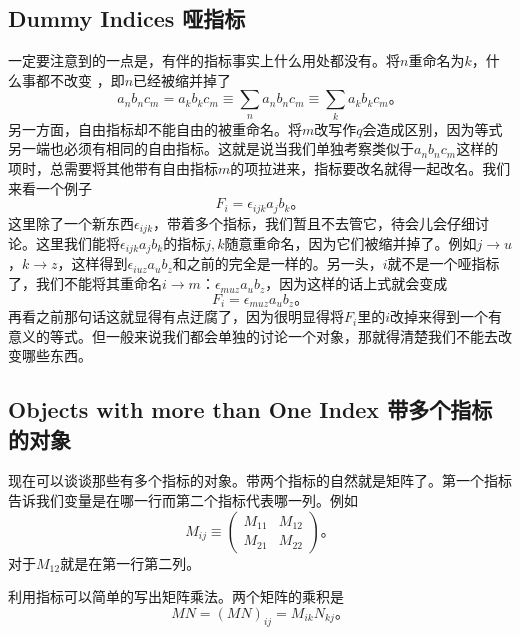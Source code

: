 \subsection[哑指标]{Dummy Indices 哑指标}\label{appendix.B.5.1}
一定要注意到的一点是，有伴的指标事实上什么用处都没有。将$n$重命名为$k$，什么事都不改变%
%
，即$n$已经被缩并掉了
\begin{equation}
a_n b_n c_m = a_k b_k c_m \equiv \sum\limits_n a_nb_nc_m \equiv \sum\limits_k a_kb_kc_m \text{。}
\end{equation}
另一方面，自由指标却不能自由的被重命名。将$m$改写作$q$会造成区别，因为等式另一端也必须有相同的自由指标。这就是说当我们单独考察类似于$a_nb_nc_m$这样的项时，总需要将其他带有自由指标$m$的项拉进来，指标要改名就得一起改名。我们来看一个例子
\begin{equation}
F_i = \epsilon_{ijk}a_jb_k\text{。}
\end{equation}
这里除了一个新东西$\epsilon_{ijk}$，带着多个指标，我们暂且不去管它，待会儿会仔细讨论。这里我们能将$\epsilon_{ijk}a_jb_k$的指标$j,k$随意重命名，因为它们被缩并掉了。例如$j\rightarrow u$，$k\rightarrow z$，这样得到$\epsilon_{iuz}a_ub_z$和之前的完全是一样的。另一头，$i$就不是一个哑指标了，我们不能将其重命名$i\rightarrow m$：$\epsilon_{muz}a_ub_z$，因为这样的话上式就会变成
\begin{equation}
F_i = \epsilon_{muz}a_ub_z \text{。}
\end{equation}
再看之前那句话这就显得有点迂腐了，因为很明显得将$F_i$里的$i$改掉来得到一个有意义的等式。但一般来说我们都会单独的讨论一个对象，那就得清楚我们不能去改变哪些东西。
\subsection[带多个指标的对象]{Objects with more than One Index 带多个指标的对象}\label{appendix.B.5.2}
现在可以谈谈那些有多个指标的对象。带两个指标的自然就是矩阵了。第一个指标告诉我们变量是在哪一行而第二个指标代表哪一列。例如
\begin{equation}
M_{ij} \equiv \begin{pmatrix}
M_{11} & M_{12} \\ M_{21} & M_{22}
\end{pmatrix}\text{。}
\end{equation}
对于$M_{12}$就是在第一行第二列。

利用指标可以简单的写出矩阵乘法。两个矩阵的乘积是
\begin{equation}
MN = (MN)_{ij} = M_{ik}N_{kj}\text{。}
\end{equation}

